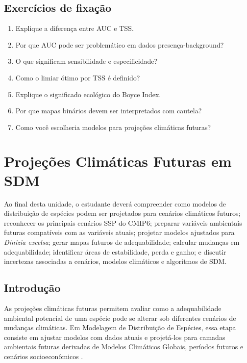\documentclass{ueap-sdm}
\begin{document}
\section{Exercícios de fixação}

\begin{enumerate}
	\item Explique a diferença entre AUC e TSS.
	\item Por que AUC pode ser problemático em dados presença-background?
	\item O que significam sensibilidade e especificidade?
	\item Como o limiar ótimo por TSS é definido?
	\item Explique o significado ecológico do Boyce Index.
	\item Por que mapas binários devem ser interpretados com cautela?
	\item Como você escolheria modelos para projeções climáticas futuras?
\end{enumerate}


\chapter[Projeções climáticas futuras]{Projeções Climáticas Futuras em SDM}

\begin{objetivos}
	Ao final desta unidade, o estudante deverá compreender como modelos de distribuição de espécies podem ser projetados para cenários climáticos futuros; reconhecer os principais cenários SSP do CMIP6; preparar variáveis ambientais futuras compatíveis com as variáveis atuais; projetar modelos ajustados para \textit{Dinizia excelsa}; gerar mapas futuros de adequabilidade; calcular mudanças em adequabilidade; identificar áreas de estabilidade, perda e ganho; e discutir incertezas associadas a cenários, modelos climáticos e algoritmos de SDM.
\end{objetivos}

\section{Introdução}

As projeções climáticas futuras permitem avaliar como a adequabilidade ambiental potencial de uma espécie pode se alterar sob diferentes cenários de mudanças climáticas. Em Modelagem de Distribuição de Espécies, essa etapa consiste em ajustar modelos com dados atuais e projetá-los para camadas ambientais futuras derivadas de Modelos Climáticos Globais, períodos futuros e cenários socioeconômicos \parencite{guisan2017habitat,ipcc2021,araujo2006climate,thuiller2005climate}.
\end{document}
